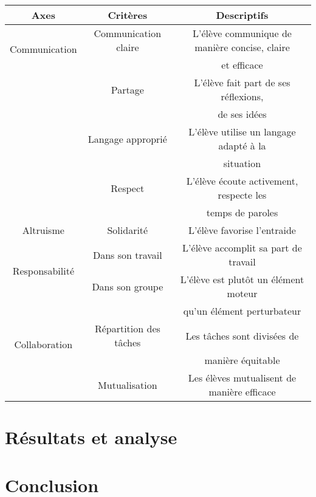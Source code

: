 \documentclass[
12pt,
french,
]{article}
\begin{document}
\begin{tabular}{|c|c|c|}  
\hline   
Axes&Critères&Descriptifs\\
\hline   
\multirow{2}{*}{Communication}
&Communication claire
&L'élève communique de manière concise, claire\\
& &et efficace\\
\cline{2-3}
&Partage&L'élève fait part de ses réflexions,\\
& &de ses idées\\

\cline{2-3}

&Langage approprié
&L'élève utilise un langage adapté à la\\
&&situation\\

\cline{2-3}

&Respect
&L'élève écoute activement, respecte les\\
& &temps de paroles\\
\hline
Altruisme&Solidarité&L'élève favorise l'entraide\\
\hline

\multirow{2}{*}{Responsabilité}&Dans son travail
&L'élève accomplit sa part de travail\\

\cline{2-3}

&Dans son groupe
&L'élève est plutôt un élément moteur\\
&&qu'un élément perturbateur\\
\hline

\multirow{2}{*}{Collaboration}
&Répartition des tâches
&Les tâches sont divisées de\\
&&manière équitable\\

\cline{2-3}

&Mutualisation&Les élèves mutualisent de manière efficace\\
\hline
\end{tabular}

\hypertarget{ruxe9sultats-et-analyse}{%
\section{Résultats et analyse}\label{ruxe9sultats-et-analyse}}

\hypertarget{conclusion}{%
\section{Conclusion}\label{conclusion}}
\end{document}
